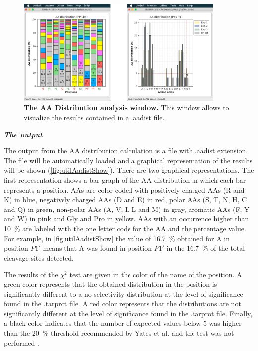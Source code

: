 \begin{figure}[h]
	\centering
	\includegraphics[width=0.9\textwidth]{./IMAGES/UTIL-AA-WINDOW/util-aa-res.jpg}	    
	\caption[The AA Distribution analysis window]{\textbf{The AA Distribution analysis window.} This window allows to visualize the results contained in a .aadist file.}
	\label{fig:utilAadistShow}
	\vspace{-5pt} 	
\end{figure}

\textit{\textbf{The output}} 

The output from the AA distribution calculation is a file with .aadist extension. The file will be automatically loaded and a graphical representation of the results will be shown (\autoref{fig:utilAadistShow}). There are two graphical representations. The first representation shows a bar graph of the AA distribution in which each bar represents a position. AAs are color coded with positively charged AAs (R and K) in blue, negatively charged AAs (D and E) in red, polar AAs (S, T, N, H, C and Q) in green, non-polar AAs (A, V, I, L and M) in gray, aromatic AAs (F, Y and W) in pink and Gly and Pro in yellow. AAs with an occurrence higher than \SI{10}{\percent} are labeled with the one letter code for the AA and the percentage value. For example, in \autoref{fig:utilAadistShow} the value of \SI{16.7}{\percent} obtained for A in position \(P1'\) means that A was found in position \(P1'\) in the \SI{16.7}{\percent} of the total cleavage sites detected. 

The results of the $\chi^2$ test are given in the color of the name of the position. A green color represents that the obtained distribution in the position is significantly different to a no selectivity distribution at the level of significance found in the .tarprot file. A red color represents that the distributions are not significantly different at the level of significance found in the .tarprot file. Finally, a black color indicates that the number of expected values below 5 was higher than the \SI{20}{\percent} threshold recommended by Yates et al. and the test was not performed \cite{Yates1999}. 

